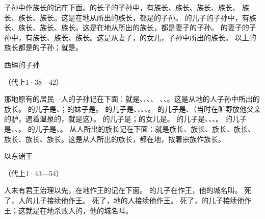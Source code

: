 {\par }{\PP {}子孙中作族长的记在下面。{}的长子{}的子孙中，有{}族长、{}族长、{}族长、{}族长、
族长、{}族长、{}族长。这是在{}地从{}所出的族长，都是{}的子孙。
的儿子{}的子孙中，有{}族长、{}族长、{}族长、{}族长。这是在{}地从{}所出的族长，都是{}妻子{}的子孙。
的妻子{}的子孙中，有{}族长、{}族长、{}族长。这是从{}妻子，{}的女儿，{}子孙中所出的族长。
以上的族长都是{}的子孙；{}就是{}。
\par }{\SH 西珥的子孙
\par }{\R （代上1·38—42）
\par }{\PP {}那地原有的居民—{}人{}的子孙记在下面：就是{}、{}、{}、{}、
、{}、{}。这是从{}地的{}人{}子孙中所出的族长。
的儿子是{}、{}；{}的妹子是{}。
的儿子是{}、{}、{}、{}、{}。
的儿子是{}、{}（当时在旷野放他父亲{}的驴，遇着温泉的，就是这{}）。
的儿子是{}；{}的女儿是{}。
的儿子是{}、{}、{}、{}。
的儿子是{}、{}、{}。
的儿子是{}、{}。
从{}人所出的族长记在下面：就是{}族长、{}族长、{}族长、{}族长、
族长、{}族长、{}族长。这是从{}人所出的族长，都在{}地，按着宗族作族长。
\par }{\SH 以东诸王
\par }{\R （代上1·43—54）
\par }{\PP {}人未有君王治理以先，在{}地作王的记在下面。
的儿子{}在{}作王，他的{}城名叫{}。
死了，{}人{}的儿子{}接续他作王。
死了，{}地的人{}接续他作王。
死了，{}的儿子{}接续他作王；这{}就是在{}地杀败{}人的，他的{}城名叫{}。
}
